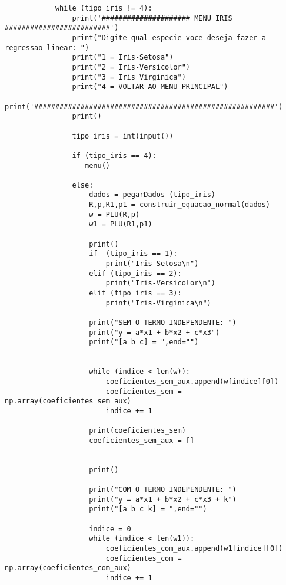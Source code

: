 \documentclass[a4paper,12pt,twoside]{article}
\begin{document}
\begin{lstlisting}
            while (tipo_iris != 4):
                print('##################### MENU IRIS #########################')
                print("Digite qual especie voce deseja fazer a regressao linear: ")
                print("1 = Iris-Setosa")
                print("2 = Iris-Versicolor")
                print("3 = Iris Virginica")
                print("4 = VOLTAR AO MENU PRINCIPAL")
                print('#########################################################')
                print()
             
                tipo_iris = int(input())
                
                if (tipo_iris == 4):
                   menu()
                   
                else:
                    dados = pegarDados (tipo_iris)
                    R,p,R1,p1 = construir_equacao_normal(dados)
                    w = PLU(R,p)
                    w1 = PLU(R1,p1)
                              
                    print()
                    if  (tipo_iris == 1):
                        print("Iris-Setosa\n")
                    elif (tipo_iris == 2):
                        print("Iris-Versicolor\n")
                    elif (tipo_iris == 3):
                        print("Iris-Virginica\n")
                        
                    print("SEM O TERMO INDEPENDENTE: ")
                    print("y = a*x1 + b*x2 + c*x3")
                    print("[a b c] = ",end="")
                    
                    
                    while (indice < len(w)):
                        coeficientes_sem_aux.append(w[indice][0])
                        coeficientes_sem = np.array(coeficientes_sem_aux)
                        indice += 1
                    
                    print(coeficientes_sem)
                    coeficientes_sem_aux = []
                    
                        
                    print()
                    
                    print("COM O TERMO INDEPENDENTE: ")
                    print("y = a*x1 + b*x2 + c*x3 + k")
                    print("[a b c k] = ",end="")
                    
                    indice = 0
                    while (indice < len(w1)):
                        coeficientes_com_aux.append(w1[indice][0])
                        coeficientes_com = np.array(coeficientes_com_aux)
                        indice += 1
                    

\end{lstlisting}
\end{document}
